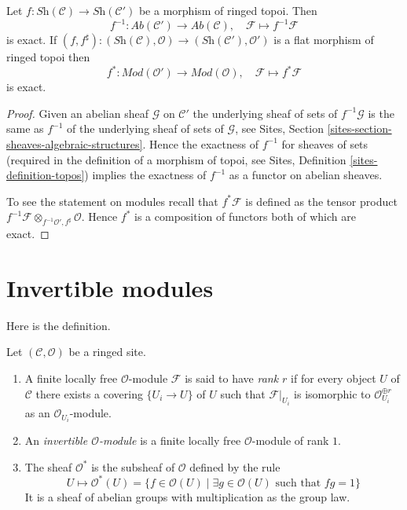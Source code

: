 \begin{lemma}
\label{lemma-flat-pullback-exact}
Let $f : \textit{Sh}(\mathcal{C}) \to \textit{Sh}(\mathcal{C}')$
be a morphism of ringed topoi. Then
$$
f^{-1} : \textit{Ab}(\mathcal{C}') \longrightarrow \textit{Ab}(\mathcal{C}),
\quad
\mathcal{F} \longmapsto f^{-1}\mathcal{F}
$$
is exact. If
$(f, f^\sharp) :
(\textit{Sh}(\mathcal{C}), \mathcal{O})
\to
(\textit{Sh}(\mathcal{C}'), \mathcal{O}')$
is a flat morphism of ringed topoi then
$$
f^* : \textit{Mod}(\mathcal{O}') \longrightarrow \textit{Mod}(\mathcal{O}),
\quad
\mathcal{F} \longmapsto f^*\mathcal{F}
$$
is exact.
\end{lemma}

\begin{proof}
Given an abelian sheaf $\mathcal{G}$ on $\mathcal{C}'$
the underlying sheaf of sets of $f^{-1}\mathcal{G}$ is the same
as $f^{-1}$ of the underlying sheaf of sets of $\mathcal{G}$, see
Sites, Section \ref{sites-section-sheaves-algebraic-structures}.
Hence the exactness of $f^{-1}$ for sheaves of sets (required in the
definition of a morphism of topoi, see
Sites, Definition \ref{sites-definition-topos})
implies the exactness of $f^{-1}$ as a functor on abelian sheaves.

\medskip\noindent
To see the statement on modules recall that $f^*\mathcal{F}$ is defined
as the tensor product
$f^{-1}\mathcal{F} \otimes_{f^{-1}\mathcal{O}', f^\sharp} \mathcal{O}$.
Hence $f^*$ is a composition of functors both of which are exact.
\end{proof}





\section{Invertible modules}
\label{section-invertible}

\noindent
Here is the definition.

\begin{definition}
\label{definition-invertible-sheaf}
Let $(\mathcal{C}, \mathcal{O})$ be a ringed site.
\begin{enumerate}
\item A finite locally free $\mathcal{O}$-module $\mathcal{F}$ is said
to have {\it rank $r$} if for every object $U$ of $\mathcal{C}$ there
exists a covering $\{U_i \to U\}$ of $U$ such that $\mathcal{F}|_{U_i}$
is isomorphic to $\mathcal{O}_{U_i}^{\oplus r}$ as an
$\mathcal{O}_{U_i}$-module.
\item An {\it invertible $\mathcal{O}$-module} is a finite locally
free $\mathcal{O}$-module of rank $1$.
\item The sheaf {\it $\mathcal{O}^*$} is the subsheaf of
$\mathcal{O}$ defined by the rule
$$
U \longmapsto \mathcal{O}^*(U) = \{f \in \mathcal{O}(U) \mid
\exists g \in \mathcal{O}(U)\text{ such that }fg = 1\}
$$
It is a sheaf of abelian groups with multiplication as the group law.
\end{enumerate}
\end{definition}

